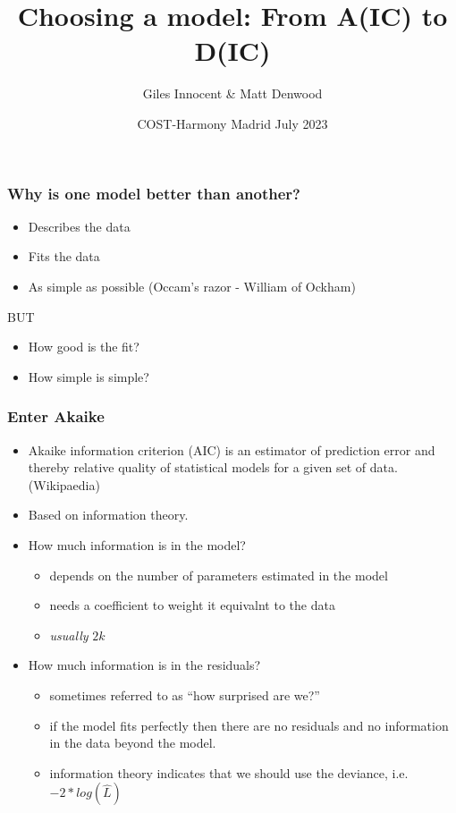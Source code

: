 \documentclass{beamer}
\title{Choosing a model: From A(IC) to D(IC)}
\author{Giles Innocent \& Matt Denwood}
\date{COST-Harmony Madrid July 2023}
\begin{document}
\maketitle

\begin{frame}
 \frametitle{Why is one model better than another?}
 \begin{itemize}
  \item Describes the data
  \item Fits the data
  \item As simple as possible (Occam's razor - William of Ockham)
 \end{itemize}
 \begin{center}
  \Huge BUT
 \end{center}
 \begin{itemize}
  \item How good is the fit?
  \item How simple is simple?
 \end{itemize}
\end{frame}

\begin{frame}
 \frametitle{Enter Akaike}
 \begin{itemize}
  \item Akaike information criterion (AIC) is an estimator of prediction error and thereby relative quality of statistical models for a given set of data. (Wikipaedia)
  \item Based on information theory.
  \item How much information is in the model?
  \begin{itemize}
   \item depends on the number of parameters estimated in the model
   \item needs a coefficient to weight it equivalnt to the data
   \item \emph{usually} $2k$
  \end{itemize}

  \item How much information is in the residuals?
  \begin{itemize}
   \item sometimes referred to as ``how surprised are we?''
   \item if the model fits perfectly then there are no residuals and no information in the data beyond the model.
   \item information theory indicates that we should use the deviance, i.e. $-2*log(\hat L)$
  \end{itemize}
 \end{itemize}
\end{frame}
\end{document}
